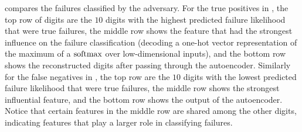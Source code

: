 
 compares the failures classified by the adversary.
For the true positives in , the top row of digits are the $10$ digits with the highest predicted failure likelihood that were true failures, the middle row shows the feature that had the strongest influence on the failure classification (decoding a one-hot vector representation of the maximum of a $\operatorname{softmax}$ over low-dimensional inputs), and the bottom row shows the reconstructed digits after passing through the autoencoder.
Similarly for the false negatives in , the top row are the $10$ digits with the lowest predicted failure likelihood that were true failures, the middle row shows the strongest influential feature, and the bottom row shows the output of the autoencoder. Notice that certain features in the middle row are shared among the other digits, indicating features that play a larger role in classifying failures.



